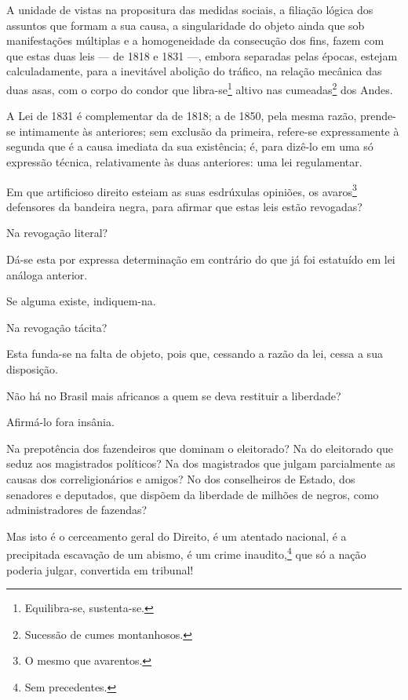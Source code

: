 A unidade de vistas na propositura das medidas sociais, a filiação
lógica dos assuntos que formam a sua causa, a singularidade do objeto
ainda que sob manifestações múltiplas e a homogeneidade da consecução
dos fins, fazem com que estas duas leis --- de 1818 e 1831 ---, embora
separadas pelas épocas, estejam calculadamente, para a inevitável
abolição do tráfico, na relação mecânica das duas asas, com o corpo do
condor que libra-se\footnote{Equilibra-se, sustenta-se.} altivo nas
cumeadas\footnote{Sucessão de cumes montanhosos.} dos Andes.

A Lei de 1831 é complementar da de 1818; a de 1850, pela mesma razão,
prende-se intimamente às anteriores; sem exclusão da primeira, refere-se
expressamente à segunda que é a causa imediata da sua existência; é,
para dizê-lo em uma só expressão técnica, relativamente às duas
anteriores: uma lei regulamentar.

\asterisc

Em que artificioso direito esteiam as suas esdrúxulas opiniões, os
avaros\footnote{O mesmo que avarentos.} defensores da bandeira negra,
para afirmar que estas leis estão revogadas?

Na revogação literal?

Dá-se esta por expressa determinação em contrário do que já foi
estatuído em lei análoga anterior.

Se alguma existe, indiquem-na.

Na revogação tácita?

Esta funda-se na falta de objeto, pois que, cessando a razão da lei,
cessa a sua disposição.

Não há no Brasil mais africanos a quem se deva restituir a liberdade?

Afirmá-lo fora insânia.

Na prepotência dos fazendeiros que dominam o eleitorado? Na do
eleitorado que seduz aos magistrados políticos? Na dos magistrados que
julgam parcialmente as causas dos correligionários e amigos? No dos
conselheiros de Estado, dos senadores e deputados, que dispõem da
liberdade de milhões de negros, como administradores de fazendas?

Mas isto é o cerceamento geral do Direito, é um atentado nacional, é a
precipitada escavação de um abismo, é um crime inaudito,\footnote{Sem
  precedentes.} que só a nação poderia julgar, convertida em tribunal!

